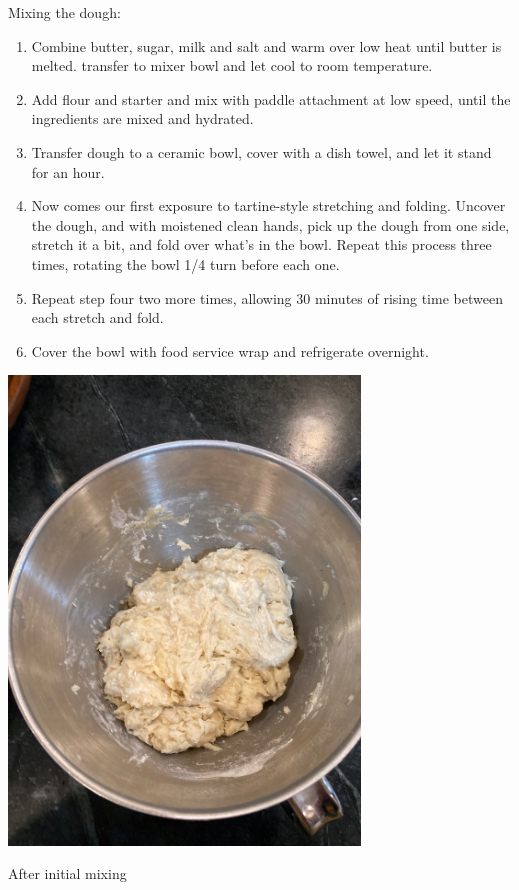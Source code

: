 \documentclass[
]{book}
\providecommand{\tightlist}{%
  \setlength{\itemsep}{0pt}\setlength{\parskip}{0pt}}
\begin{document}
Mixing the dough:

\begin{enumerate}
\def\labelenumi{\arabic{enumi}.}
\tightlist
\item
  Combine butter, sugar, milk and salt and warm over low heat until butter is melted. transfer to mixer bowl and let cool to room temperature.
\item
  Add flour and starter and mix with paddle attachment at low speed, until the ingredients are mixed and hydrated.
\item
  Transfer dough to a ceramic bowl, cover with a dish towel, and let it stand for an hour.
\item
  Now comes our first exposure to tartine-style stretching and folding. Uncover the dough, and with moistened clean hands, pick up the dough from one side, stretch it a bit, and fold over what's in the bowl. Repeat this process three times, rotating the bowl 1/4 turn before each one.
\item
  Repeat step four two more times, allowing 30 minutes of rising time between each stretch and fold.
\item
  Cover the bowl with food service wrap and refrigerate overnight.
\end{enumerate}

\includegraphics[width=0.7\textwidth,height=\textheight]{images/drolls1.jpeg}

After initial mixing
\end{document}
